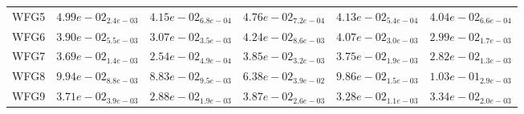 \documentclass{article}
\begin{document}
\begin{table}
\begin{scriptsize}
\begin{tabular}{llllll}
WFG5 & $  4.99e-02_{ 2.4e-03}$ & $  4.15e-02_{ 6.8e-04}$ & $  4.76e-02_{ 7.2e-04}$ & \cellcolor{gray25}$  4.13e-02_{ 5.4e-04}$ & \cellcolor{gray95}$  4.04e-02_{ 6.6e-04}$ \\
WFG6 & $  3.90e-02_{ 5.5e-03}$ & \cellcolor{gray25}$  3.07e-02_{ 3.5e-03}$ & $  4.24e-02_{ 8.6e-03}$ & $  4.07e-02_{ 3.0e-03}$ & \cellcolor{gray95}$  2.99e-02_{ 1.7e-03}$ \\
WFG7 & $  3.69e-02_{ 1.4e-03}$ & \cellcolor{gray95}$  2.54e-02_{ 4.9e-04}$ & $  3.85e-02_{ 3.2e-03}$ & $  3.75e-02_{ 1.9e-03}$ & \cellcolor{gray25}$  2.82e-02_{ 1.3e-03}$ \\
WFG8 & $  9.94e-02_{ 8.8e-03}$ & \cellcolor{gray25}$  8.83e-02_{ 9.5e-03}$ & \cellcolor{gray95}$  6.38e-02_{ 3.9e-02}$ & $  9.86e-02_{ 1.5e-03}$ & $  1.03e-01_{ 2.9e-03}$ \\
WFG9 & $  3.71e-02_{ 3.9e-03}$ & \cellcolor{gray95}$  2.88e-02_{ 1.9e-03}$ & $  3.87e-02_{ 2.6e-03}$ & \cellcolor{gray25}$  3.28e-02_{ 1.1e-03}$ & $  3.34e-02_{ 2.0e-03}$ \\
\hline
\end{tabular}
\end{scriptsize}
\end{table}
\end{document}
